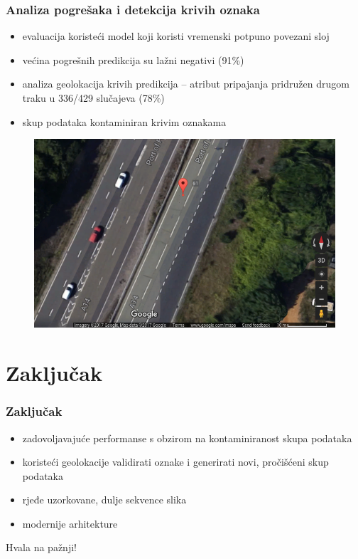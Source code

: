 \documentclass{beamer}
\begin{document}
\begin{frame}
 \frametitle{Analiza pogrešaka i detekcija krivih oznaka}
 \begin{itemize}
  \item evaluacija koristeći model koji koristi vremenski potpuno povezani sloj
  \item većina pogrešnih predikcija su lažni negativi (91\%)
  \item analiza geolokacija krivih predikcija -- atribut pripajanja pridružen drugom traku u 336/429 slučajeva (78\%)
  \item skup podataka kontaminiran krivim oznakama
 \end{itemize}
 
  \begin{figure}[H]
\centering
\includegraphics[scale=0.25]{images/wrong_lane_label.png}
\end{figure} 

\end{frame}

\section{Zaključak}

\begin{frame}
\frametitle{Zaključak}
 \begin{itemize}
  \item zadovoljavajuće performanse s obzirom na kontaminiranost skupa podataka
  \item koristeći geolokacije validirati oznake i generirati novi, pročišćeni skup podataka
  \item rjeđe uzorkovane, dulje sekvence slika
  \item modernije arhitekture
 \end{itemize}

\end{frame}

\begin{frame}
\Huge{\centerline{Hvala na pažnji!}}
\end{frame}
\end{document}
